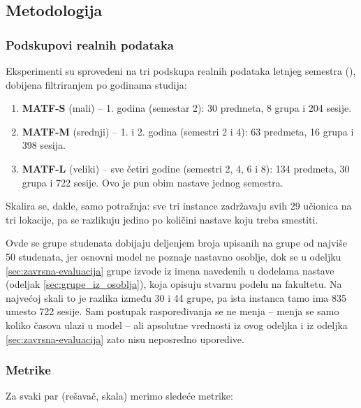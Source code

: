\documentclass[12pt,oneside]{memoir}
\begin{document}
\subsection{Metodologija}
\label{sec:metodologija}

\subsubsection{Podskupovi realnih podataka}

Eksperimenti su sprovedeni na tri podskupa realnih podataka letnjeg
semestra (), dobijena filtriranjem po
godinama studija:

\begin{enumerate}
\item \textbf{MATF-S} (mali) -- 1. godina (semestar 2): 30 predmeta,
  8 grupa i 204 sesije.

\item \textbf{MATF-M} (srednji) -- 1. i 2. godina (semestri 2 i 4):
  63 predmeta, 16 grupa i 398 sesija.

\item \textbf{MATF-L} (veliki) -- sve četiri godine (semestri 2, 4, 6
  i 8): 134 predmeta, 30 grupa i 722 sesije. Ovo je pun obim nastave
  jednog semestra.
\end{enumerate}

Skalira se, dakle, samo potražnja: sve tri instance zadržavaju svih 29
učionica na tri lokacije, pa se razlikuju jedino po količini nastave
koju treba smestiti.

Ovde se grupe studenata dobijaju deljenjem broja upisanih na grupe od najviše 50
studenata, jer osnovni model ne poznaje nastavno osoblje, dok se u
odeljku \ref{sec:zavrsna-evaluacija} grupe izvode iz imena navedenih u
dodelama nastave (odeljak \ref{sec:grupe_iz_osoblja}), koja opisuju
stvarnu podelu na fakultetu. Na najvećoj skali to je razlika između 30
i 44 grupe, pa ista instanca tamo ima 835 umesto 722 sesije. Sam
postupak raspoređivanja se ne menja -- menja se samo koliko časova
ulazi u model -- ali apsolutne vrednosti iz ovog odeljka i iz odeljka
\ref{sec:zavrsna-evaluacija} zato nisu neposredno uporedive.

\subsubsection{Metrike}

Za svaki par (rešavač, skala) merimo sledeće metrike:
\end{document}
